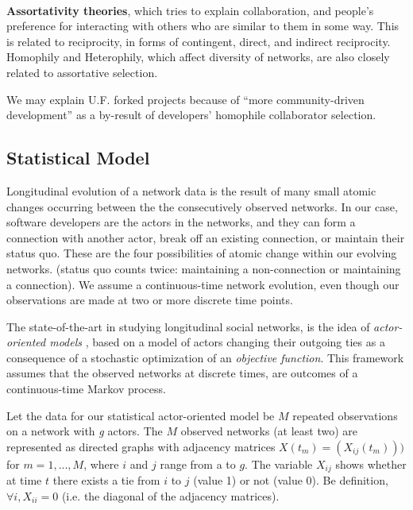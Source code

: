 \documentclass{report}
\begin{document}
\paragraph{} \textbf{Assortativity theories}, which tries to explain collaboration, and people's preference for interacting with others who are similar to them in some way. This is related to reciprocity, in forms of contingent, direct, and indirect reciprocity. Homophily and Heterophily, which affect diversity of networks, are also closely related to assortative selection.

We may explain U.F. forked projects because of ``more community-driven development'' as a by-result of developers' homophile collaborator selection.


\subsection{Statistical Model}
\label{statisticalModel}

Longitudinal evolution of a network data is the result of many small atomic changes occurring between the the consecutively observed networks. In our case, software developers are the actors in the networks, and they can form a connection with another actor, break off an existing connection, or maintain their status quo. These are the four possibilities of atomic change within our evolving networks. (status quo counts twice: maintaining a non-connection or maintaining a connection). We assume a continuous-time network evolution, even though our observations are made at two or more discrete time points. 

The state-of-the-art in studying longitudinal social networks, is the idea of \textit{actor-oriented models} \cite{Snijders2010}, based on a model of actors changing their outgoing ties as a consequence of a stochastic optimization of an \textit{objective function}. This framework assumes that the observed networks at discrete times, are outcomes of a continuous-time Markov process.

Let the data for our statistical actor-oriented model be $M$ repeated observations on a network with \textit{g} actors. The $M$ observed networks (at least two) are represented as directed graphs with adjacency matrices $X(t_m) = (X_{ij}(t_m)))$ for $m = 1,...,M$, where $i$ and $j$ range from a to $g$. The variable $X_{ij}$ shows whether at time $t$ there exists a tie from $i$ to $j$ (value 1) or not (value 0). Be definition, $\forall i, X_{ii}=0$ (i.e. the diagonal of the adjacency matrices).
\end{document}
